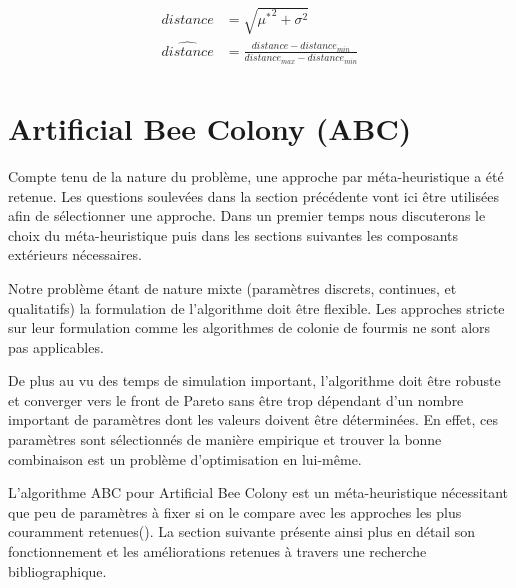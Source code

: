 \begin{align}\label{eq:distance_norm}
    \begin{split}
        distance        &= \sqrt{{\mu^{*}}^2 + \sigma^{2}} \\
        \hat{distance}  &=  \frac{distance - distance_{min}}{distance_{max} - distance_{min}}
    \end{split}
\end{align}





\section{Artificial Bee Colony (ABC)} %
\label{sec:artificial_bee_colony}
Compte tenu de la nature du problème, une approche par méta-heuristique
a été retenue. Les questions soulevées dans la section précédente vont ici être utilisées
afin de sélectionner une approche. Dans un premier temps nous discuterons le choix
du méta-heuristique puis dans les sections suivantes les composants extérieurs
nécessaires.

Notre problème étant de nature mixte (paramètres discrets, continues, et qualitatifs)
la formulation de l’algorithme doit être flexible. Les approches stricte sur leur
formulation comme les algorithmes de colonie de fourmis ne sont alors pas applicables.

De plus au vu des temps de simulation important, l’algorithme doit être robuste
et converger vers le front de Pareto sans être trop dépendant d’un nombre important
de paramètres dont les valeurs doivent être déterminées. En effet, ces paramètres
sont sélectionnés de manière empirique et trouver la bonne combinaison est un problème
d’optimisation en lui-même.

L’algorithme ABC pour Artificial Bee Colony est un méta-heuristique nécessitant
que peu de paramètres à fixer si on le compare avec les approches les plus
couramment retenues().
La section suivante présente ainsi plus en détail son fonctionnement et les améliorations
retenues à travers une recherche bibliographique.


